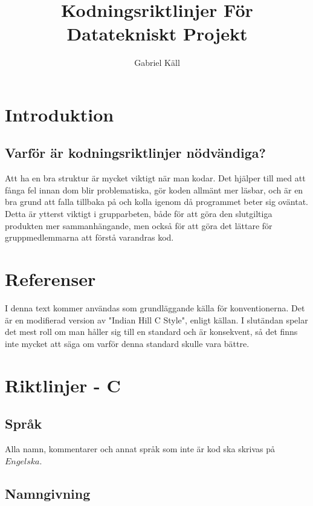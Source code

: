 \documentclass[a4paper]{article}
\title{Kodningsriktlinjer För Datatekniskt Projekt}
\author{Gabriel Käll}
\begin{document}
 

\maketitle
{}

\newpage
\tableofcontents
{}

\newpage
{}

\section{Introduktion}

\label{sec:intro}

\subsection*{Varför är kodningsriktlinjer nödvändiga?}
    Att ha en bra struktur är mycket viktigt när man kodar. Det hjälper till med att fånga fel innan dom blir problematiska, gör koden allmänt mer läsbar, och är en bra grund att falla tillbaka på och kolla igenom då programmet beter sig oväntat.
    Detta är ytterst viktigt i grupparbeten, både för att göra den slutgiltiga produkten mer sammanhängande, men också för att göra det lättare för gruppmedlemmarna att förstå varandras kod. 
    
\section{Referenser}
I denna text kommer \cite{spencer:2008} användas som grundläggande källa för konventionerna. Det är en modifierad version av "Indian Hill C Style", enligt källan. 
I slutändan spelar det mest roll om man håller sig till en standard och är konsekvent, så det finns inte mycket att säga om varför denna standard skulle vara bättre. 
    

\section{Riktlinjer - C}

\subsection{Språk}
Alla namn, kommentarer och annat språk som inte är kod ska skrivas på \(Engelska\).

\subsection{Namngivning} 
\end{document}
